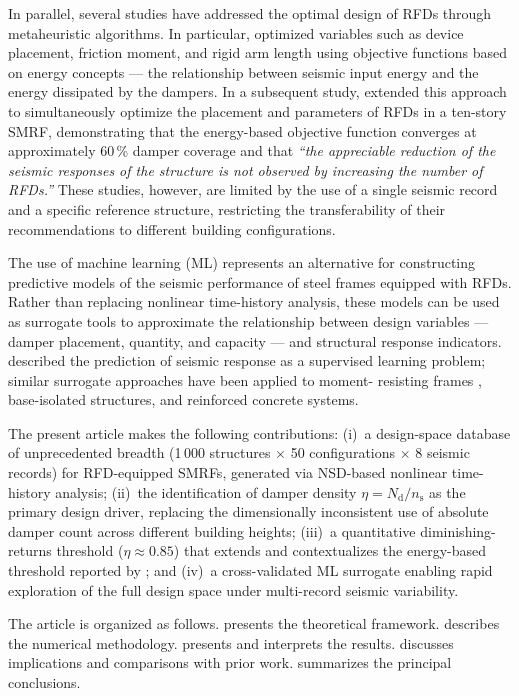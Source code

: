 \documentclass[preprint,12pt,authoryear]{elsarticle}
\newcommand{\nd}{N_{\mathrm{d}}}               %
\newcommand{\np}{n_{\mathrm{s}}}               %
\newcommand{\etad}{\eta}                        %
\begin{document}
In parallel, several studies have addressed the optimal design of RFDs through
metaheuristic algorithms. In particular, \citet{Jarrahi2020jbe} optimized
variables such as device placement, friction moment, and rigid arm length using
objective functions based on energy concepts --- the relationship between seismic
input energy and the energy dissipated by the dampers. In a subsequent study,
\citet{Jarrahi2020sdee} extended this approach to simultaneously optimize the
placement and parameters of RFDs in a ten-story SMRF, demonstrating that the
energy-based objective function converges at approximately 60\,\% damper coverage
and that \textit{``the appreciable reduction of the seismic responses of the
structure is not observed by increasing the number of RFDs.''} These studies,
however, are limited by the use of a single seismic record and a specific
reference structure, restricting the transferability of their recommendations
to different building configurations.

The use of machine learning (ML) represents an alternative for constructing
predictive models of the seismic performance of steel frames equipped with RFDs.
Rather than replacing nonlinear time-history analysis, these models can be used
as surrogate tools to approximate the relationship between design variables ---
damper placement, quantity, and capacity --- and structural response indicators.
\citet{Kazemi2022} described the prediction of seismic response as a supervised
learning problem; similar surrogate approaches have been applied to moment-
resisting frames \citep{Zhang2020}, base-isolated structures, and reinforced
concrete systems.

The present article makes the following contributions: (i)~a design-space
database of unprecedented breadth (1\,000 structures $\times$ 50 configurations
$\times$ 8 seismic records) for RFD-equipped SMRFs, generated via NSD-based
nonlinear time-history analysis; (ii)~the identification of damper density
$\etad = \nd/\np$ as the primary design driver, replacing the
dimensionally inconsistent use of absolute damper count across different building
heights; (iii)~a quantitative diminishing-returns threshold ($\etad \approx
0.85$) that extends and contextualizes the energy-based threshold reported by
\citet{Jarrahi2020sdee}; and (iv)~a cross-validated ML surrogate enabling rapid
exploration of the full design space under multi-record seismic variability.

The article is organized as follows.  presents the theoretical
framework.  describes the numerical methodology.
 presents and interprets the results. 
discusses implications and comparisons with prior work. 
summarizes the principal conclusions.
\end{document}
